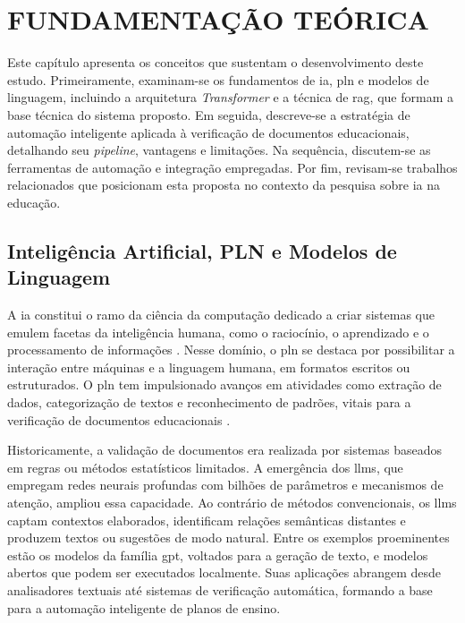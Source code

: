 \chapter{FUNDAMENTAÇÃO TEÓRICA}
Este capítulo apresenta os conceitos que sustentam o desenvolvimento deste estudo. Primeiramente, examinam-se os fundamentos de \gls{ia}, \gls{pln} e modelos de linguagem, incluindo a arquitetura \textit{Transformer} e a técnica de \gls{rag}, que formam a base técnica do sistema proposto. Em seguida, descreve-se a estratégia de automação inteligente aplicada à verificação de documentos educacionais, detalhando seu \textit{pipeline}, vantagens e limitações. Na sequência, discutem-se as ferramentas de automação e integração empregadas. Por fim, revisam-se trabalhos relacionados que posicionam esta proposta no contexto da pesquisa sobre \gls{ia} na educação.

\section{Inteligência Artificial, PLN e Modelos de Linguagem}
A \acrlong{ia} constitui o ramo da ciência da computação dedicado a criar sistemas que emulem facetas da inteligência humana, como o raciocínio, o aprendizado e o processamento de informações \cite{RussellNorvig2021}. Nesse domínio, o \gls{pln} se destaca por possibilitar a interação entre máquinas e a linguagem humana, em formatos escritos ou estruturados. O \gls{pln} tem impulsionado avanços em atividades como extração de dados, categorização de textos e reconhecimento de padrões, vitais para a verificação de documentos educacionais \cite{RussellNorvig2021}.

Historicamente, a validação de documentos era realizada por sistemas baseados em regras ou métodos estatísticos limitados. A emergência dos \glspl{llm}, que empregam redes neurais profundas com bilhões de parâmetros e mecanismos de atenção, ampliou essa capacidade. Ao contrário de métodos convencionais, os \glspl{llm} captam contextos elaborados, identificam relações semânticas distantes e produzem textos ou sugestões de modo natural. Entre os exemplos proeminentes estão os modelos da família \gls{gpt}, voltados para a geração de texto, e modelos abertos que podem ser executados localmente. Suas aplicações abrangem desde analisadores textuais até sistemas de verificação automática, formando a base para a automação inteligente de planos de ensino.

